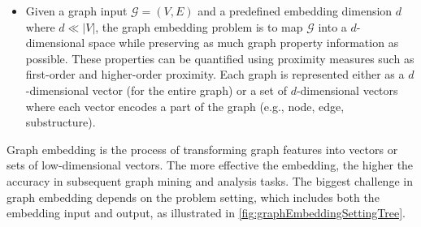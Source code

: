\begin{itemize}
	\[
	\resizebox{\linewidth}{!}{$
	s^{(2)}_{12} = \cos(s^{(1)}_1, s^{(1)}_2) = 0.43, \quad s^{(2)}_{15} = \cos(s^{(1)}_1, s^{(1)}_5) = 0.
	$}
	\]
	
	We observe that the second-order proximity between \(v_1\) and \(v_5\) is 0 because they share no common 1-hop neighbors. \(v_1\) and \(v_2\) share a common neighbor \(v_3\), thus their second-order proximity \(s^{(2)}_{12}\) is greater than 0.
	
	Higher-order proximities can be defined similarly. For example, the \(k\)-th order proximity between \(v_i\) and \(v_j\) is the similarity between \(s^{(k-1)}_i\) and \(s^{(k-1)}_j\).
	
	\item
	\begin{definition}\label{def:graphEmbedding}
		Given a graph input \(\mathcal{G} = (V, E)\) and a predefined embedding dimension \(d\) where \(d \ll |V|\), the graph embedding problem is to map \(\mathcal{G}\) into a \(d\)-dimensional space while preserving as much graph property information as possible. These properties can be quantified using proximity measures such as first-order and higher-order proximity. Each graph is represented either as a \(d\)-dimensional vector (for the entire graph) or a set of \(d\)-dimensional vectors where each vector encodes a part of the graph (e.g., node, edge, substructure).
	\end{definition}
\end{itemize}


Graph embedding is the process of transforming graph features into vectors or sets of low-dimensional vectors. The more effective the embedding, the higher the accuracy in subsequent graph mining and analysis tasks. The biggest challenge in graph embedding depends on the problem setting, which includes both the embedding input and output, as illustrated in \autoref{fig:graphEmbeddingSettingTree}.

